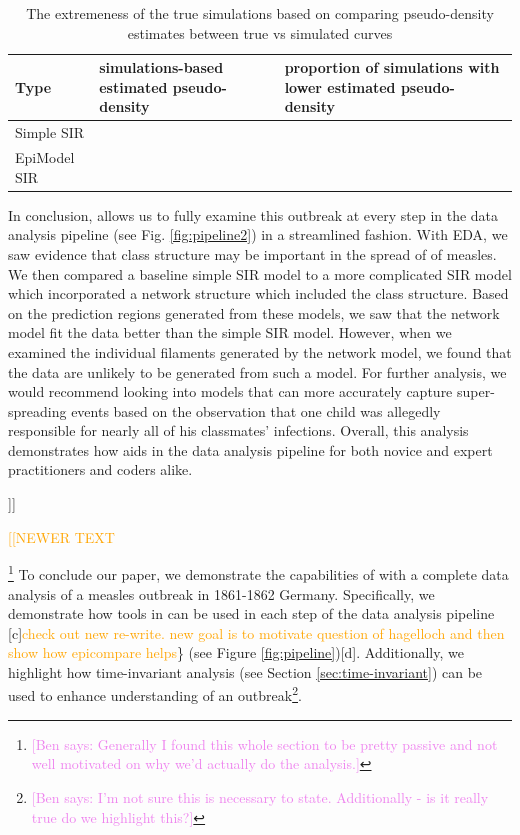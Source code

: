 \documentclass[
  shortnames]{jss}
\begin{document}
\begin{CodeChunk}
\begin{table}[!h]

\caption{\label{tab:hags-extreme}The extremeness of the true simulations based on comparing pseudo-density estimates between true vs simulated curves}
\centering
\begin{tabular}[t]{l>{\raggedleft\arraybackslash}p{6cm}>{\raggedleft\arraybackslash}p{6cm}}
\toprule
Type & simulations-based estimated pseudo-density & proportion of simulations with lower estimated pseudo-density\\
\midrule
Simple SIR & 0.0036733 & 0\\
EpiModel SIR & 0.0028813 & 0\\
\bottomrule
\end{tabular}
\end{table}

\end{CodeChunk}

In conclusion,  allows us to fully examine this outbreak
at every step in the data analysis pipeline (see Fig.
\ref{fig:pipeline2}) in a streamlined fashion. With EDA, we saw evidence
that class structure may be important in the spread of of measles. We
then compared a baseline simple SIR model to a more complicated SIR
model which incorporated a network structure which included the class
structure. Based on the prediction regions generated from these models,
we saw that the network model fit the data better than the simple SIR
model. However, when we examined the individual filaments generated by
the network model, we found that the data are unlikely to be generated
from such a model. For further analysis, we would recommend looking into
models that can more accurately capture super-spreading events based on
the observation that one child was allegedly responsible for nearly all
of his classmates' infections. Overall, this analysis demonstrates how
 aids in the data analysis pipeline for both novice and
expert practitioners and coders alike.

{]}{]}

\textcolor{orange}{[[NEWER TEXT}

\footnote{\textcolor{violet}{[Ben says: Generally I found this whole section to be pretty passive and not well motivated on why we'd actually do the analysis.]}}
To conclude our paper, we demonstrate the capabilities of
 with a complete data analysis of a measles outbreak in
1861-1862 Germany. Specifically, we demonstrate how tools in
 can be used in each step of the data analysis pipeline
{[}c{]}\textcolor{orange}{check out new re-write.  new goal is to motivate question of hagelloch and then show how epicompare helps}\}
(see Figure \ref{fig:pipeline}){[}d{]}. Additionally, we highlight how
time-invariant analysis (see Section \ref{sec:time-invariant}) can be
used to enhance understanding of an
outbreak\footnote{\textcolor{violet}{[Ben says: I'm not sure this is necessary to state. Additionally - is it really true do we highlight this?]}}.
\end{document}
